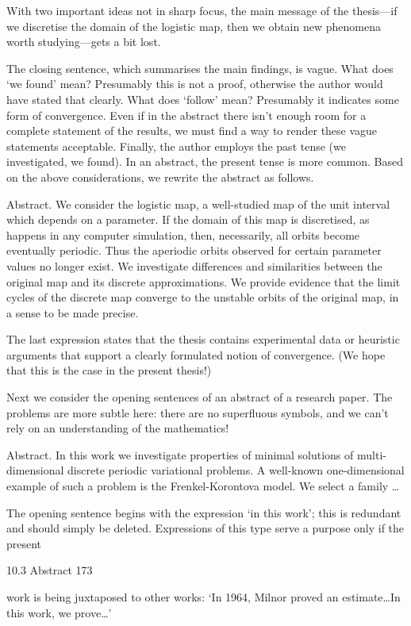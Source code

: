 \documentclass[11pt]{article}
\theoremstyle{plain}
\theoremstyle{definition}
\begin{document}
With two important ideas not in sharp focus, the main message of the thesis---if we discretise the domain of the logistic map, then we obtain new phenomena worth studying---gets a bit lost.

The closing sentence, which summarises the main findings, is vague. What does `we found' mean? Presumably this is not a proof, otherwise the author would have stated that clearly. What does `follow' mean? Presumably it indicates some form of convergence. Even if in the abstract there isn't enough room for a complete statement of the results, we must find a way to render these vague statements acceptable. Finally, the author employs the past tense (we investigated, we found). In an abstract, the present tense is more common. Based on the above considerations, we rewrite the abstract as follows.

Abstract. We consider the logistic map, a well-studied map of the unit interval which depends on a parameter. If the domain of this map is discretised, as happens in any computer simulation, then, necessarily, all orbits become eventually periodic. Thus the aperiodic orbits observed for certain parameter values no longer exist. We investigate differences and similarities between the original map and its discrete approximations. We provide evidence that the limit cycles of the discrete map converge to the unstable orbits of the original map, in a sense to be made precise.

The last expression states that the thesis contains experimental data or heuristic arguments that support a clearly formulated notion of convergence. (We hope that this is the case in the present thesis!)

Next we consider the opening sentences of an abstract of a research paper. The problems are more subtle here: there are no superfluous symbols, and we can't rely on an understanding of the mathematics!

Abstract. In this work we investigate properties of minimal solutions of multi-dimensional discrete periodic variational problems. A well-known one-dimensional example of such a problem is the Frenkel-Korontova model. We select a family \dots{}

The opening sentence begins with the expression `in this work'; this is redundant and should simply be deleted. Expressions of this type serve a purpose only if the present

10.3 Abstract 173

work is being juxtaposed to other works: `In 1964, Milnor proved an estimate\dots{}In this work, we prove\dots{}'
\end{document}
